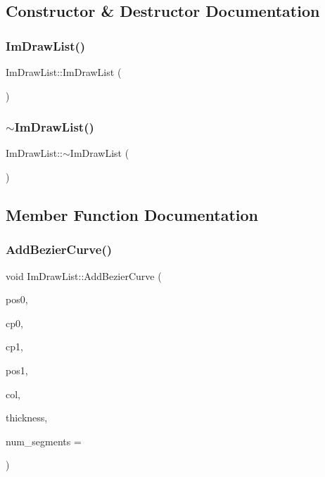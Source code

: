 \subsection{Constructor \& Destructor Documentation}
\hypertarget{struct_im_draw_list_a297376db2edb295095171dcc2dbed860}{}\label{struct_im_draw_list_a297376db2edb295095171dcc2dbed860} 
\subsubsection{\texorpdfstring{Im\+Draw\+List()}{ImDrawList()}}
{\footnotesize\ttfamily Im\+Draw\+List\+::\+Im\+Draw\+List (\begin{DoxyParamCaption}{ }\end{DoxyParamCaption})}

\hypertarget{struct_im_draw_list_a19fd8d920c202cf8ba5f5c55c43d1d2a}{}\label{struct_im_draw_list_a19fd8d920c202cf8ba5f5c55c43d1d2a} 
\subsubsection{\texorpdfstring{$\sim$\+Im\+Draw\+List()}{~ImDrawList()}}
{\footnotesize\ttfamily Im\+Draw\+List\+::$\sim$\+Im\+Draw\+List (\begin{DoxyParamCaption}{ }\end{DoxyParamCaption})}



\subsection{Member Function Documentation}
\hypertarget{struct_im_draw_list_afd2eeeb8ed23b6222513953b03620101}{}\label{struct_im_draw_list_afd2eeeb8ed23b6222513953b03620101} 
\subsubsection{\texorpdfstring{Add\+Bezier\+Curve()}{AddBezierCurve()}}
{\footnotesize\ttfamily void Im\+Draw\+List\+::\+Add\+Bezier\+Curve (\begin{DoxyParamCaption}\item[{const \hyperlink{struct_im_vec2}{Im\+Vec2} \&}]{pos0,  }\item[{const \hyperlink{struct_im_vec2}{Im\+Vec2} \&}]{cp0,  }\item[{const \hyperlink{struct_im_vec2}{Im\+Vec2} \&}]{cp1,  }\item[{const \hyperlink{struct_im_vec2}{Im\+Vec2} \&}]{pos1,  }\item[{Im\+U32}]{col,  }\item[{float}]{thickness,  }\item[{int}]{num\+\_\+segments = {} }\end{DoxyParamCaption})}

